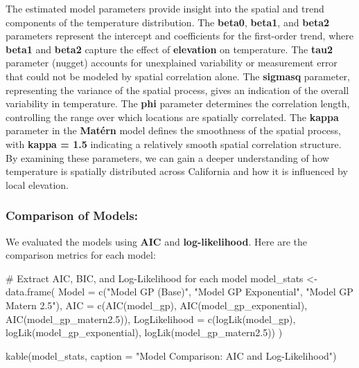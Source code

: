 \documentclass[
  11pt,
]{article}
\newenvironment{Shaded}{\begin{snugshade}}{\end{snugshade}}
\newcommand{\AttributeTok}[1]{\textcolor[rgb]{0.40,0.45,0.13}{#1}}
\newcommand{\CommentTok}[1]{\textcolor[rgb]{0.37,0.37,0.37}{#1}}
\newcommand{\FloatTok}[1]{\textcolor[rgb]{0.68,0.00,0.00}{#1}}
\newcommand{\FunctionTok}[1]{\textcolor[rgb]{0.28,0.35,0.67}{#1}}
\newcommand{\NormalTok}[1]{\textcolor[rgb]{0.00,0.23,0.31}{#1}}
\newcommand{\OtherTok}[1]{\textcolor[rgb]{0.00,0.23,0.31}{#1}}
\newcommand{\StringTok}[1]{\textcolor[rgb]{0.13,0.47,0.30}{#1}}
\begin{document}
The estimated model parameters provide insight into the spatial and
trend components of the temperature distribution. The \textbf{beta0},
\textbf{beta1}, and \textbf{beta2} parameters represent the intercept
and coefficients for the first-order trend, where \textbf{beta1} and
\textbf{beta2} capture the effect of \textbf{elevation} on temperature.
The \textbf{tau2} parameter (nugget) accounts for unexplained
variability or measurement error that could not be modeled by spatial
correlation alone. The \textbf{sigmasq} parameter, representing the
variance of the spatial process, gives an indication of the overall
variability in temperature. The \textbf{phi} parameter determines the
correlation length, controlling the range over which locations are
spatially correlated. The \textbf{kappa} parameter in the
\textbf{Matérn} model defines the smoothness of the spatial process,
with \textbf{kappa = 1.5} indicating a relatively smooth spatial
correlation structure. By examining these parameters, we can gain a
deeper understanding of how temperature is spatially distributed across
California and how it is influenced by local elevation.

\subsubsection{Comparison of Models:}\label{comparison-of-models}

We evaluated the models using \textbf{AIC} and \textbf{log-likelihood}.
Here are the comparison metrics for each model:

\begin{Shaded}
\begin{Highlighting}[]
\CommentTok{\# Extract AIC, BIC, and Log{-}Likelihood for each model}
\NormalTok{model\_stats }\OtherTok{\textless{}{-}} \FunctionTok{data.frame}\NormalTok{(}
  \AttributeTok{Model =} \FunctionTok{c}\NormalTok{(}\StringTok{"Model GP (Base)"}\NormalTok{, }\StringTok{"Model GP Exponential"}\NormalTok{, }\StringTok{"Model GP Matern 2.5"}\NormalTok{),}
  \AttributeTok{AIC =} \FunctionTok{c}\NormalTok{(}\FunctionTok{AIC}\NormalTok{(model\_gp), }\FunctionTok{AIC}\NormalTok{(model\_gp\_exponential), }\FunctionTok{AIC}\NormalTok{(model\_gp\_matern2}\FloatTok{.5}\NormalTok{)),}
  \AttributeTok{LogLikelihood =} \FunctionTok{c}\NormalTok{(}\FunctionTok{logLik}\NormalTok{(model\_gp), }\FunctionTok{logLik}\NormalTok{(model\_gp\_exponential), }\FunctionTok{logLik}\NormalTok{(model\_gp\_matern2}\FloatTok{.5}\NormalTok{))}
\NormalTok{)}

\FunctionTok{kable}\NormalTok{(model\_stats, }\AttributeTok{caption =} \StringTok{"Model Comparison: AIC and Log{-}Likelihood"}\NormalTok{)}
\end{Highlighting}
\end{Shaded}
\end{document}
